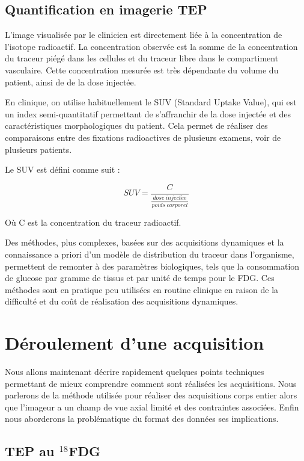 \section{Quantification en imagerie TEP}

L'image visualisée par le clinicien est directement liée à  la concentration de l'isotope radioactif. La concentration observée est la somme de la concentration du traceur piégé dans les cellules et du traceur libre dans le compartiment vasculaire. Cette concentration mesurée est très dépendante du volume du patient, ainsi de de la dose injectée.

En clinique, on utilise habituellement le SUV (Standard Uptake Value), qui est un index semi-quantitatif permettant de s'affranchir de la dose injectée et des caractéristiques morphologiques du patient. Cela permet de réaliser des comparaisons entre des fixations radioactives de plusieurs examens, voir de plusieurs patients.

Le SUV est défini comme suit :

\begin{equation}
SUV=\frac{C}{ \frac{dose~inject\acute{e}e}{poids~corporel} }
\end{equation}

Où C est la concentration du traceur radioactif.

Des méthodes, plus complexes, basées sur des acquisitions dynamiques et la connaissance a priori d'un modèle de distribution du traceur dans l'organisme, permettent de remonter à des paramètres biologiques, tels que la consommation de glucose par gramme de tissus et par unité de temps pour le FDG. Ces méthodes sont en pratique peu utilisées en routine clinique en raison de la difficulté et du coût de réalisation des acquisitions dynamiques.
\chapter{Déroulement d'une acquisition}


Nous allons maintenant décrire rapidement quelques points techniques permettant de mieux comprendre comment sont réalisées les acquisitions. Nous parlerons de la méthode utilisée pour réaliser des acquisitions corps entier alors que l'imageur a un champ de vue axial limité et des contraintes associées. Enfin nous aborderons la problématique du format des données ses implications.

\section{TEP au $^{18}$FDG}


